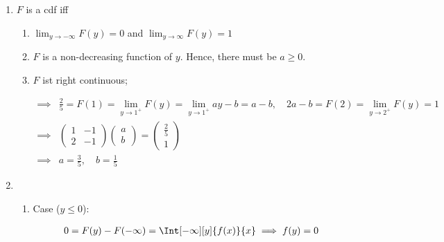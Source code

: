 \begin{solution}

\phantom{}

\begin{enumerate}[label = (\alph*)]

    \item $F$ is a cdf iff

    \begin{enumerate}[label = (\arabic*)]

        \item $\lim_{y \to -\infty} F(y) = 0$ and $\lim_{y \to \infty} F(y) = 1$

        \item $F$ is a non-decreasing function of $y$.
        Hence, there must be $a \geq 0$.

        \item $F$ ist right continuous;

        \begin{align*}
            \implies &
            \frac{2}{5} = F(1) = \lim_{y \to 1^+} F(y) = \lim_{y \to 1^+} a y - b = a - b,
            \quad
            2 a - b = F(2) = \lim_{y \to 2^+} F(y) = 1 \\
            \implies &
            \begin{pmatrix}
                1 & -1 \\ 2 & -1
            \end{pmatrix}
            \begin{pmatrix}
                a \\ b
            \end{pmatrix}
            =
            \begin{pmatrix}
                \frac{2}{5} \\ 1
            \end{pmatrix} \\
            \implies &
            a = \frac{3}{5}, \quad b = \frac{1}{5}
        \end{align*}

    \end{enumerate}

    \item

    \begin{enumerate}[label = \arabic*.]

        \item Case ($y \leq 0$):

        \begin{align*}
            0 = F(y) - F(-\infty) = \Int[-\infty][y]{f(x)}{x}
            \implies
            f(y) = 0
        \end{align*}


\end{enumerate}
\end{enumerate}
\end{solution}
